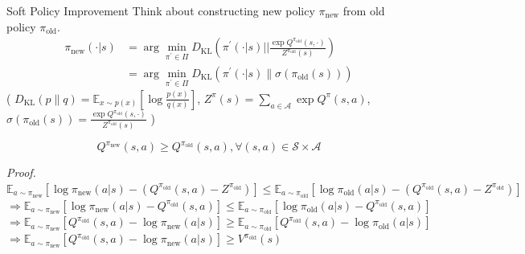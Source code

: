 \documentclass[8pt]{beamer}
\begin{document}
\begin{frame}{Soft Policy Improvement}
    Think about constructing new policy \(\pi_{\text{new}}\) from old policy $\pi_{\text{old}}$.
    \[
    \begin{aligned}
        \pi_{\text{new}}(\cdot |s) &= \arg \min_{\pi^\prime \in \Pi} D_{\text{KL}} \left( \pi^\prime (\cdot | s) \left| \right| \frac{\exp{Q^{\pi_{\text{old}}}}(s, \cdot)}{Z^{\pi_\text{old}}(s)} \right)\\
        &= \arg \min_{\pi^\prime \in \Pi} D_{\text{KL}} \left( \pi^\prime (\cdot|s) \parallel \sigma(\pi_{\text{old}}(s)) \right)
    \end{aligned}
    \]
    ( $D_{\text{KL}} (p \parallel q) = \mathbb{E}_{x \sim p(x)}\left[\log{\frac{p(x)}{q(x)}}\right]$, \( Z^{\pi}(s) = \sum_{a \in \mathcal{A}} \exp{Q^{\pi}}(s, a)\), \(\sigma(\pi_{\text{old}}(s))= \frac{\exp{Q^{\pi_{\text{old}}}}(s, \cdot)}{Z^{\pi_{\text{old}}}(s)}\) )
    \begin{theorem}
        \[
            Q^{\pi_{\text{new}}} (s, a) \geq Q^{\pi_{\text{old}}}(s, a), \forall (s, a) \in \mathcal{S} \times \mathcal{A}
        \]
    \end{theorem}

\textit{Proof.} 
\( \mathbb{E}_{a \sim \pi_{\text{new}}}[\log{\pi_{\text{new}}(a|s)} - (Q^{\pi_{\text{old}}}(s, a) - Z^{\pi_{\text{old}}})] \leq \mathbb{E}_{a \sim \pi_{\text{old}}}[\log{\pi_{\text{old}}}(a|s) - (Q^{\pi_{\text{old}}}(s, a) - Z^{\pi_{\text{old}}})] \)
\(\Rightarrow \mathbb{E}_{a \sim \pi_{\text{new}}}[\log{\pi_{\text{new}}}(a|s) - Q^{\pi_{\text{old}}}(s, a)] \leq \mathbb{E}_{a\sim \pi_{\text{old}}}[\log{\pi_{\text{old}}}(a|s) - Q^{\pi_{\text{old}}}(s,a)]\) 
\(\Rightarrow \mathbb{E}_{a \sim \pi_{\text{new}}}[Q^{\pi_{\text{old}}}(s,a) - \log{\pi_{\text{new}}}(a|s)] \geq \mathbb{E}_{a \sim \pi_{\text{old}}}[Q^{\pi_{\text{old}}}(s,a) - \log{\pi_{\text{old}}}(a|s)] \)
\(\Rightarrow \mathbb{E}_{a \sim \pi_{\text{new}}}[Q^{\pi_{\text{old}}}(s,a) - \log{\pi_{\text{new}}}(a|s)] \geq V^{\pi_{\text{old}}}(s)\)
\end{frame}
\end{document}
